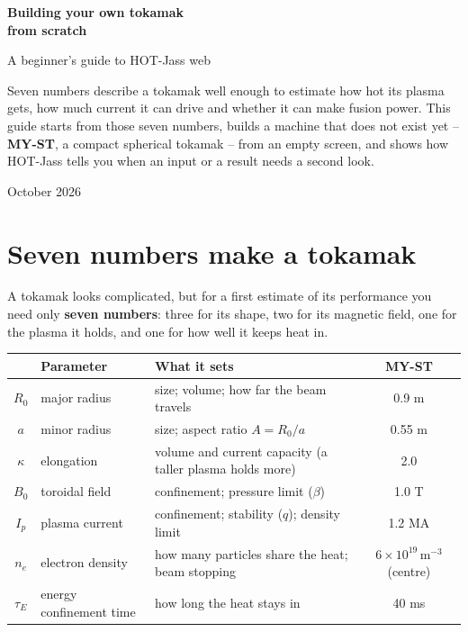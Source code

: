 \documentclass[11pt,a4paper]{article}
\begin{document}
\begin{titlepage}
\centering
\vspace*{30mm}
{\Huge\bfseries\color{hjmagenta!80!black} Building your own tokamak\\[2mm] from scratch\par}
\vspace{8mm}
{\Large A beginner's guide to HOT-Jass web\par}
\vspace{18mm}
\begin{minipage}{0.82\textwidth}
\large
Seven numbers describe a tokamak well enough to estimate how hot its plasma
gets, how much current it can drive and whether it can make fusion power.
This guide starts from those seven numbers, builds a machine that does not
exist yet -- \textbf{MY-ST}, a compact spherical tokamak -- from an empty
screen, and shows how HOT-Jass tells you when an input or a result needs a
second look.
\end{minipage}
\vfill
{\large October 2026\par}
\end{titlepage}

\tableofcontents
\newpage

\section{Seven numbers make a tokamak}

A tokamak looks complicated, but for a first estimate of its performance you
need only \textbf{seven numbers}: three for its shape, two for its magnetic
field, one for the plasma it holds, and one for how well it keeps heat in.

\begin{center}
\renewcommand{\arraystretch}{1.25}
\begin{tabularx}{\textwidth}{c l X c}
\toprule
 & \textbf{Parameter} & \textbf{What it sets} & \textbf{MY-ST} \\
\midrule
$R_0$ & major radius & size; volume; how far the beam travels & 0.9 m \\
$a$ & minor radius & size; aspect ratio $A = R_0/a$ & 0.55 m \\
$\kappa$ & elongation & volume and current capacity (a taller plasma holds more) & 2.0 \\
$B_0$ & toroidal field & confinement; pressure limit ($\beta$) & 1.0 T \\
$I_p$ & plasma current & confinement; stability ($q$); density limit & 1.2 MA \\
$n_e$ & electron density & how many particles share the heat; beam stopping & $6\times10^{19}\,\mathrm{m^{-3}}$ (centre)\\
$\tau_E$ & energy confinement time & how long the heat stays in & 40 ms \\
\bottomrule
\end{tabularx}
\end{center}
\end{document}
